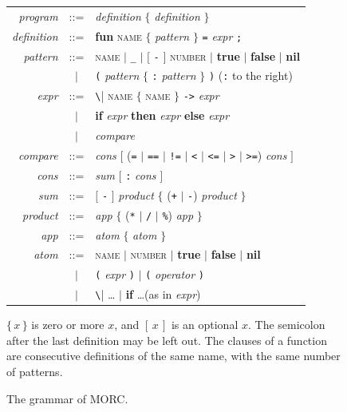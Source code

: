 \documentclass[11pt,a4paper]{article}
\theoremstyle{definition}
\theoremstyle{plain}
\newcommand{\kw}[1]{\textbf{#1}}
\newcommand{\nt}[1]{\textit{#1}}
\begin{document}
\begin{figure}[t]
\centering
\begin{tcolorbox}[enhanced, colback=black!2, colframe=black!35, boxrule=0.5pt,
  arc=2pt, width=0.95\textwidth, left=8pt, right=8pt]
\small
\renewcommand{\arraystretch}{1.15}
\begin{tabular}{@{}r@{\;\;}c@{\;\;}l@{}}
\nt{program} & ::= & \nt{definition} $\{$ \nt{definition} $\}$\\
\nt{definition} & ::= & \kw{fun} \textsc{name} $\{$ \nt{pattern} $\}$ \texttt{=} \nt{expr} \texttt{;}\\
\nt{pattern} & ::= & \textsc{name} $\mid$ \verb|_| $\mid$ $[$ \verb|-| $]$ \textsc{number} $\mid$ \kw{true} $\mid$ \kw{false} $\mid$ \kw{nil}\\
 & $\mid$ & \verb|(| \nt{pattern} $\{$ \verb|:| \nt{pattern} $\}$ \verb|)| \hfill (\verb|:| to the right)\\[4pt]
\nt{expr} & ::= & \verb|\| \textsc{name} $\{$ \textsc{name} $\}$ \verb|->| \nt{expr}\\
 & $\mid$ & \kw{if} \nt{expr} \kw{then} \nt{expr} \kw{else} \nt{expr}\\
 & $\mid$ & \nt{compare}\\
\nt{compare} & ::= & \nt{cons} $[$ (\verb|=| $\mid$ \verb|==| $\mid$ \verb|!=| $\mid$ \verb|<| $\mid$ \verb|<=| $\mid$ \verb|>| $\mid$ \verb|>=|) \nt{cons} $]$\\
\nt{cons} & ::= & \nt{sum} $[$ \verb|:| \nt{cons} $]$\\
\nt{sum} & ::= & $[$ \verb|-| $]$ \nt{product} $\{$ (\verb|+| $\mid$ \verb|-|) \nt{product} $\}$\\
\nt{product} & ::= & \nt{app} $\{$ (\verb|*| $\mid$ \verb|/| $\mid$ \verb|%|) \nt{app} $\}$\\
\nt{app} & ::= & \nt{atom} $\{$ \nt{atom} $\}$\\
\nt{atom} & ::= & \textsc{name} $\mid$ \textsc{number} $\mid$ \kw{true} $\mid$ \kw{false} $\mid$ \kw{nil}\\
 & $\mid$ & \verb|(| \nt{expr} \verb|)| $\mid$ \verb|(| \nt{operator} \verb|)|\\
 & $\mid$ & \verb|\| \ldots{} $\mid$ \kw{if} \ldots \hfill (as in \nt{expr})\\
\end{tabular}

\medskip
\footnotesize
$\{\,x\,\}$ is zero or more $x$, and $[\,x\,]$ is an optional $x$. The
semicolon after the last definition may be left out. The clauses of a
function are consecutive definitions of the same name, with the same number
of patterns.
\end{tcolorbox}
\caption{The grammar of MORC.}
\label{fig:grammar}
\end{figure}
\end{document}

